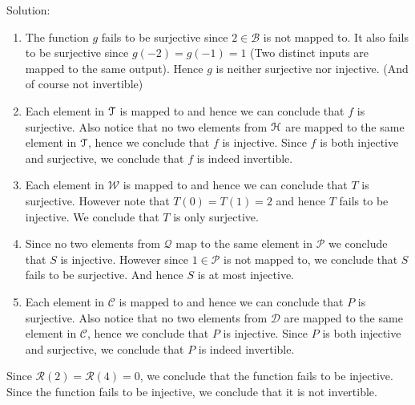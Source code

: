 \documentclass[12pt]{article} %
\begin{document}
\begin{qstn}
  \begin{solution}Solution:
  \begin{enumerate}[label=(\alph*)]
    \item The function $g$ fails to be surjective since $2 \in \mathcal{B}$ is not mapped to. It also fails to
      be surjective since $g(-2) = g(-1) = 1$ (Two distinct inputs are mapped to the same output). Hence $g$ is neither
      surjective nor injective. (And of course not invertible)
    \item Each element in $\EuScript{T}$ is mapped to and hence we can conclude that $f$ is surjective. Also notice that 
      no two elements from $\EuScript{H}$ are mapped to the same element in $\EuScript{T}$, hence we conclude that $f$ is
      injective. Since $f$ is both injective and surjective, we conclude that $f$ is indeed invertible.
    \item Each element in $\mathcal{W}$ is mapped to and hence we can conclude that $T$ is surjective. However note that
      $T(0) = T(1) = 2$ and hence $T$ fails to be injective. We conclude that $T$ is only surjective.
    \item Since no two elements from $\mathcal{Q}$ map to the same element in $\mathcal{P}$ we conclude that $S$ is injective.
      However since  $1 \in \mathcal{P}$ is not mapped to, we conclude that $S$ fails to be surjective. And hence $S$ is at
      most injective.
    \item Each element in $\mathcal{C}$ is mapped to and hence we can conclude that $P$ is surjective. Also notice that 
      no two elements from $\mathcal{D}$ are mapped to the same element in $\mathcal{C}$, hence we conclude that $P$ is
      injective. Since $P$ is both injective and surjective, we conclude that $P$ is indeed invertible.
  \end{enumerate}
    
  \end{solution}
\end{qstn}

\begin{qstn}
  \begin{solution}
    Since $\mathcal{R}(2) = \mathcal{R}(4) = 0$, we conclude that the function fails to be injective. Since the function fails
    to be injective, we conclude that it is not invertible.
  \end{solution}
\end{qstn}
\end{document}
